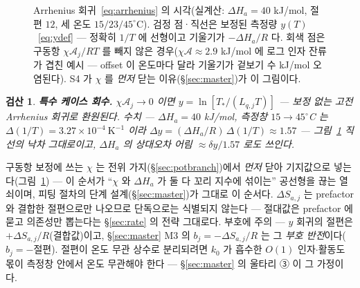 \documentclass[11pt,a4paper]{article}
\newtheorem*{verifybox}{검산}
\begin{document}
\begin{figure}[t]
\centering
{}
\caption{Arrhenius 회귀~\eqref{eq:arrhenius} 의 시각(실계산: $\Delta H_a=40$ kJ/mol, 절편 $12$,
세 온도 $15/23/45^\circ$C). 검정 점·직선은 보정된 측정량 $y(T)$~\eqref{eq:ydef} — 정확히
$1/T$ 에 선형이고 기울기가 $-\Delta H_a/R$ 다. 회색 점은 구동항 $\chi\mathcal A_j/RT$ 를 빼지 않은
경우($\chi\mathcal A\approx2.9$ kJ/mol 에 로그 인자 잔류가 겹친 예시 — offset 이 온도마다 달라
기울기가 겉보기 수 kJ/mol 오염된다). S4 가 $\chi$ 를
\emph{먼저} 닫는 이유(\S\ref{sec:master})가 이 그림이다.}
\label{fig:arrplot}
\end{figure}

\begin{verifybox}
\textbf{특수 케이스 회수.} $\chi\mathcal A_j\to0$ 이면 $y=\ln[T_*/(L_{q,j}T)]$ — 보정 없는
고전 Arrhenius 회귀로 환원된다. 수치 — $\Delta H_a=40$ kJ/mol, 측정창 $15\to45^\circ$C 는
$\Delta(1/T)=3.27\times10^{-4}\ \mathrm{K^{-1}}$ 이라
$\Delta y=(\Delta H_a/R)\,\Delta(1/T)\approx1.57$ — 그림~\ref{fig:arrplot} 직선의 낙차
그대로이고, $\Delta H_a$ 의 상대오차 어림 $\approx\delta y/1.57$ 로도 쓰인다.
\end{verifybox}

구동항 보정에 쓰는 $\chi$ 는 전위 가지(\S\ref{sec:potbranch})에서 \emph{먼저} 닫아 기지값으로
넣는다(그림~\ref{fig:arrplot}) —
이 순서가 ``$\chi$ 와 $\Delta H_a$ 가 둘 다 꼬리 지수에 섞이는'' 공선형을 끊는 열쇠이며, 피팅 절차의
단계 설계(\S\ref{sec:master})가 그대로 이 순서다. $\Delta S_{a,j}$ 는 prefactor 와 결합한 절편으로만
나오므로 단독으로는 식별되지 않는다 — 절대값은 prefactor 에 묻고 의존성만 뽑는다는 \S\ref{sec:rate} 의
전략 그대로다. 부호에 주의 — $y$ 회귀의 절편은 $+\Delta S_{a,j}/R$(결합값)이고, \S\ref{sec:master}
M3 의 $b_j=-\Delta S_{a,j}/R$ 는 그 \emph{부호 반전}이다($b_j=-$절편). 절편이 온도 무관 상수로 분리되려면
$k_0$ 가 흡수한 $O(1)$ 인자$\cdot$활동도 몫이 측정창 안에서 온도 무관해야 한다 — \S\ref{sec:master}
의 울타리 ③ 이 그 가정이다.
\end{document}
